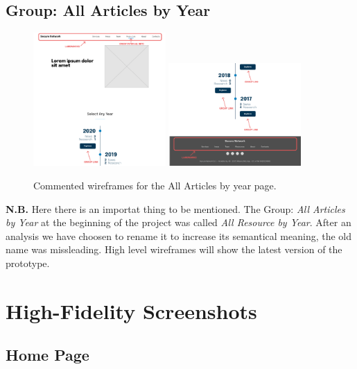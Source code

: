 \documentclass[12pt]{report}
\begin{document}
\subsection{Group: All Articles by Year}

\begin{figure}[H]
	\centering
	\includegraphics[width=0.45\textwidth]{low_fid_wireframes/all_articles/1.png}
	\includegraphics[width=0.45\textwidth]{low_fid_wireframes/all_articles/2.png}
	\caption{Commented wireframes for the All Articles by year page.}
\end{figure}
\textbf{N.B.} Here there is an importat thing to be mentioned. The Group: 
\emph{All Articles by Year} at the  beginning of the project was called
\emph{All Resource by Year}. After an analysis we have choosen to rename 
it to increase its semantical meaning, the old name was missleading.
High level wireframes will show the latest version of the prototype.
\section{High-Fidelity Screenshots}

\subsection{Home Page}
\end{document}
